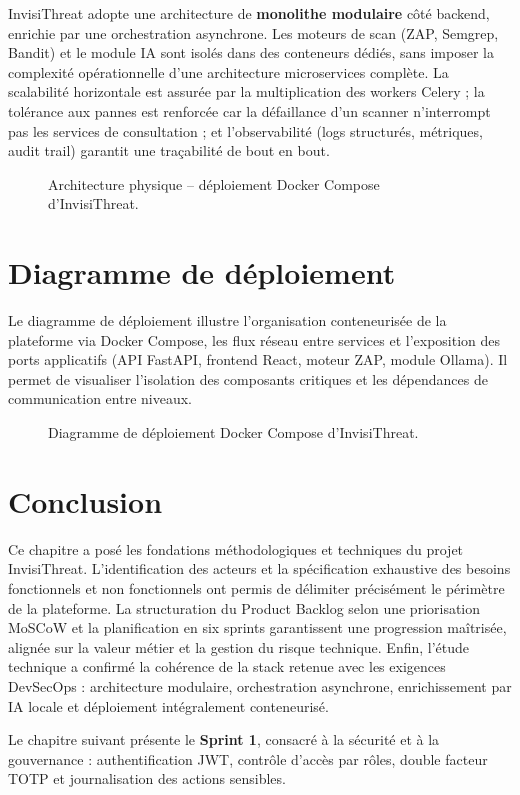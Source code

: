 InvisiThreat adopte une architecture de \textbf{monolithe modulaire} côté backend,
enrichie par une orchestration asynchrone. Les moteurs de scan (ZAP, Semgrep, Bandit)
et le module IA sont isolés dans des conteneurs dédiés, sans imposer la complexité
opérationnelle d'une architecture microservices complète. La scalabilité horizontale
est assurée par la multiplication des workers Celery ; la tolérance aux pannes est
renforcée car la défaillance d'un scanner n'interrompt pas les services de consultation ;
et l'observabilité (logs structurés, métriques, audit trail) garantit une traçabilité
de bout en bout.

\begin{figure}[H]
\centering
\fbox{\rule{0pt}{2in}\rule{0.9\linewidth}{0pt}}
\caption{Architecture physique -- déploiement Docker Compose d'InvisiThreat.}
\label{fig:archi-physique}
\end{figure}

\section{Diagramme de déploiement}

Le diagramme de déploiement illustre l'organisation conteneurisée de la plateforme
via Docker Compose, les flux réseau entre services et l'exposition des ports
applicatifs (API FastAPI, frontend React, moteur ZAP, module Ollama). Il permet
de visualiser l'isolation des composants critiques et les dépendances de
communication entre niveaux.

\begin{figure}[H]
\centering
\fbox{\rule{0pt}{2in}\rule{0.9\linewidth}{0pt}}
\caption{Diagramme de déploiement Docker Compose d'InvisiThreat.}
\label{fig:comp-deployment}
\end{figure}

\section{Conclusion}

Ce chapitre a posé les fondations méthodologiques et techniques du projet InvisiThreat.
L'identification des acteurs et la spécification exhaustive des besoins fonctionnels
et non fonctionnels ont permis de délimiter précisément le périmètre de la plateforme.
La structuration du Product Backlog selon une priorisation MoSCoW et la planification
en six sprints garantissent une progression maîtrisée, alignée sur la valeur métier
et la gestion du risque technique. Enfin, l'étude technique a confirmé la cohérence
de la stack retenue avec les exigences DevSecOps : architecture modulaire,
orchestration asynchrone, enrichissement par IA locale et déploiement intégralement
conteneurisé.

Le chapitre suivant présente le \textbf{Sprint 1}, consacré à la sécurité et à
la gouvernance : authentification JWT, contrôle d'accès par rôles, double facteur
TOTP et journalisation des actions sensibles.